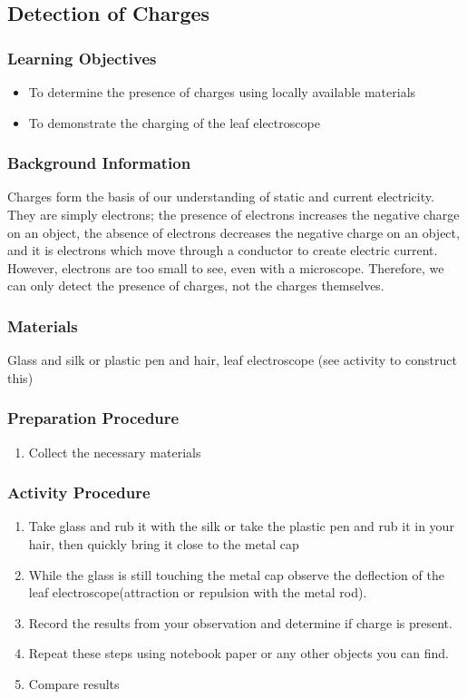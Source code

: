\subsection{Detection of Charges}

\subsubsection*{Learning Objectives}
\begin{itemize}
\item{To determine the presence of charges using locally available materials} 
\item{To demonstrate the charging of the leaf electroscope} 
\end{itemize}

\subsubsection*{Background Information}
Charges form the basis of our understanding of static and current electricity. They are simply electrons; the presence of electrons increases the negative charge on an object, the absence of electrons decreases the negative charge on an object, and it is electrons which move through a conductor to create electric current. However, electrons are too small to see, even with a microscope. Therefore, we can only detect the presence of charges, not the charges themselves.

\subsubsection*{Materials}
Glass and silk or plastic pen and hair, leaf electroscope (see activity to construct this)

\subsubsection*{Preparation Procedure}
\begin{enumerate}
\item{Collect the necessary materials}
\end{enumerate}

\subsubsection*{Activity Procedure}
\begin{enumerate}
\item{Take glass and rub it with the silk or take the plastic pen and rub it in your hair, then quickly bring it close to the metal cap}
\item{While the glass is still touching the metal cap observe the deflection of the leaf electroscope(attraction or repulsion with the metal rod).} 
\item{Record the results from your observation and determine if charge is present.} 
\item{Repeat these steps using notebook paper or any other objects you can find.} 
\item{Compare results}
\end{enumerate}

